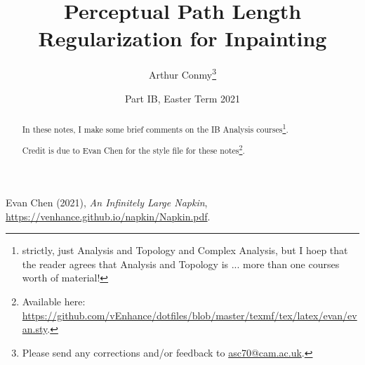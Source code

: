 \documentclass[11pt]{scrartcl}
\begin{document}
\title{Perceptual Path Length Regularization for Inpainting}
\author{Arthur Conmy\footnote{Please send any corrections and/or feedback to \url{asc70@cam.ac.uk}.}}
\date{Part IB, Easter Term 2021}

\maketitle
\begin{abstract}
In these notes, I make some brief comments on the IB Analysis courses\footnote{strictly, just Analysis and Topology and Complex Analysis, but I hoep that the reader agrees that Analysis and Topology is ... more than one courses worth of material!}.

Credit is due to Evan Chen for the style file for these notes\footnote{Available here: \url{https://github.com/vEnhance/dotfiles/blob/master/texmf/tex/latex/evan/evan.sty}.}.
\end{abstract}


\begin{thebibliography}{9}
    Evan Chen (2021), \emph{An Infinitely Large Napkin}, \url{https://venhance.github.io/napkin/Napkin.pdf}.
\end{thebibliography}    
\end{document}
